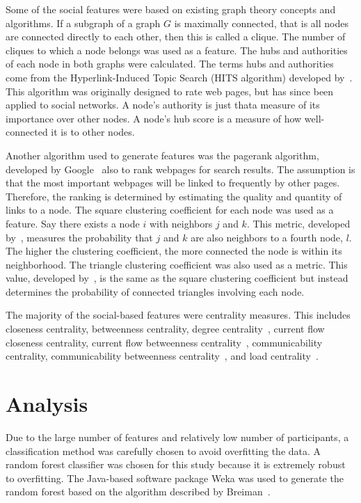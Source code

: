 \documentclass[10pt,twocolumn,conference]{IEEEtran}
\begin{document}
Some of the social features were based on existing graph theory concepts and algorithms.
If a subgraph of a graph $G$ is maximally connected, that is all nodes are connected directly to each other, then this is called a clique.
The number of cliques to which a node belongs was used as a feature.
The hubs and authorities of each node in both graphs were calculated.
The terms hubs and authorities come from the Hyperlink-Induced Topic Search (HITS algorithm) developed by~\cite{kleinberg1999hubs}.
This algorithm was originally designed to rate web pages, but has since been applied to social networks.
A node's authority is just that\textemdash{}a measure of its importance over other nodes.
A node's hub score is a measure of how well-connected it is to other nodes.

Another algorithm used to generate features was the pagerank algorithm, developed by Google~\cite{page1999pagerank} also to rank webpages for search results.
The assumption is that the most important webpages will be linked to frequently by other pages.
Therefore, the ranking is determined by estimating the quality and quantity of links to a node.
The square clustering coefficient for each node was used as a feature.
Say there exists a node $i$ with neighbors $j$ and $k$.
This metric, developed by~\cite{lind2005cycles}, measures the probability that $j$ and $k$ are also neighbors to a fourth node, $l$.
The higher the clustering coefficient, the more connected the node is within its neighborhood.
The triangle clustering coefficient was also used as a metric.
This value, developed by~\cite{saramaki2007generalizations}, is the same as the square clustering coefficient but instead determines the probability of connected triangles involving each node.

The majority of the social-based features were centrality measures.
This includes closeness centrality, betweenness centrality, degree centrality~\cite{borgatti2011analyzing}, current flow closeness centrality, current flow betweenness centrality~\cite{brandes2005centrality}, communicability centrality, communicability betweenness centrality~\cite{estrada2008communicability}, and load centrality~\cite{newman2001structure}.

\section{Analysis} \label{Analysis}
Due to the large number of features and relatively low number of participants, a classification method was carefully chosen to avoid overfitting the data.
A random forest classifier was chosen for this study because it is extremely robust to overfitting.
The Java-based software package Weka was used to generate the random forest based on the algorithm described by Breiman~\cite{Breiman2001}.
\end{document}
